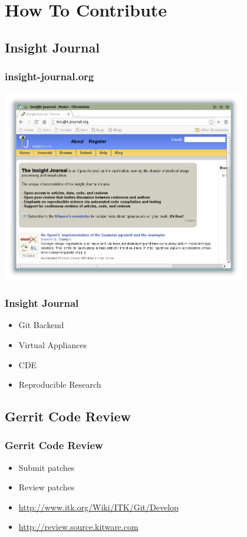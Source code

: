 \section{How To Contribute}

\subsection{Insight Journal}


\begin{frame}
  \frametitle{insight-journal.org}
  \includegraphics[width=0.8\textwidth]{../Art/InsightJournal.png}
\end{frame}

\begin{frame}
\frametitle{Insight Journal}
\Huge
\begin{itemize}
\item Git Backend
\pause
\item Virtual Appliances
\pause
\item CDE
\pause
\item Reproducible Research
\end{itemize}
\end{frame}

\subsection{Gerrit Code Review}

\begin{frame}
  \frametitle{Gerrit Code Review}
  \begin{itemize}
    \item Submit patches
    \item Review patches
    \item \url{http://www.itk.org/Wiki/ITK/Git/Develop}
    \item \url{http://review.source.kitware.com}
  \end{itemize}
\end{frame}

